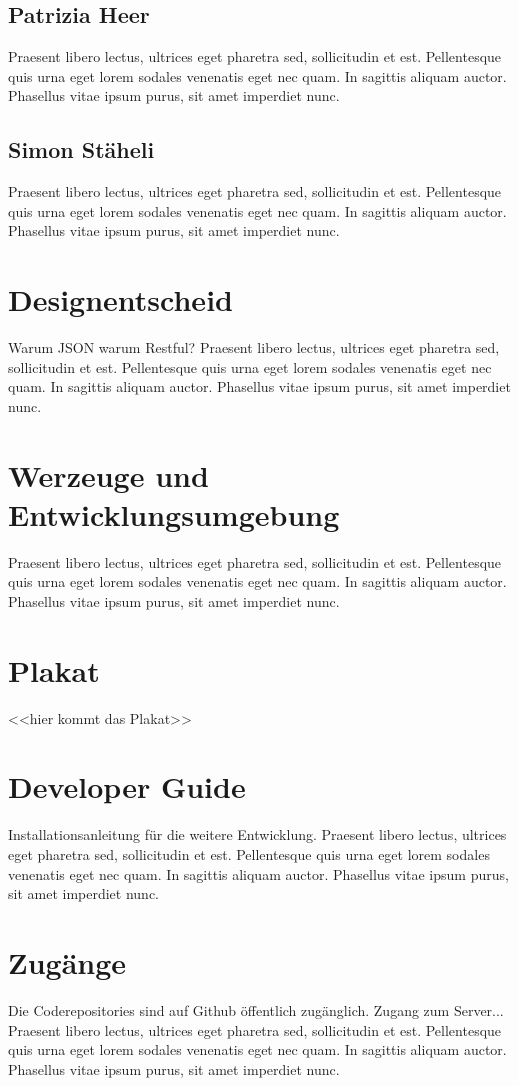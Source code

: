 \subsection{Patrizia Heer}
Praesent libero lectus, ultrices eget pharetra sed, sollicitudin et est. Pellentesque quis urna eget lorem sodales venenatis eget nec quam. In sagittis aliquam auctor. Phasellus vitae ipsum purus, sit amet imperdiet nunc. 

\subsection{Simon Stäheli}
Praesent libero lectus, ultrices eget pharetra sed, sollicitudin et est. Pellentesque quis urna eget lorem sodales venenatis eget nec quam. In sagittis aliquam auctor. Phasellus vitae ipsum purus, sit amet imperdiet nunc.

\section{Designentscheid}
Warum JSON warum Restful? Praesent libero lectus, ultrices eget pharetra sed, sollicitudin et est. Pellentesque quis urna eget lorem sodales venenatis eget nec quam. In sagittis aliquam auctor. Phasellus vitae ipsum purus, sit amet imperdiet nunc. 

\section{Werzeuge und Entwicklungsumgebung}
Praesent libero lectus, ultrices eget pharetra sed, sollicitudin et est. Pellentesque quis urna eget lorem sodales venenatis eget nec quam. In sagittis aliquam auctor. Phasellus vitae ipsum purus, sit amet imperdiet nunc. 

\section{Plakat}
<<hier kommt das Plakat>>

\section{Developer Guide}
Installationsanleitung für die weitere Entwicklung.
Praesent libero lectus, ultrices eget pharetra sed, sollicitudin et est. Pellentesque quis urna eget lorem sodales venenatis eget nec quam. In sagittis aliquam auctor. Phasellus vitae ipsum purus, sit amet imperdiet nunc. 

\section{Zugänge}
Die Coderepositories sind auf Github öffentlich zugänglich. Zugang zum Server... Praesent libero lectus, ultrices eget pharetra sed, sollicitudin et est. Pellentesque quis urna eget lorem sodales venenatis eget nec quam. In sagittis aliquam auctor. Phasellus vitae ipsum purus, sit amet imperdiet nunc. 

